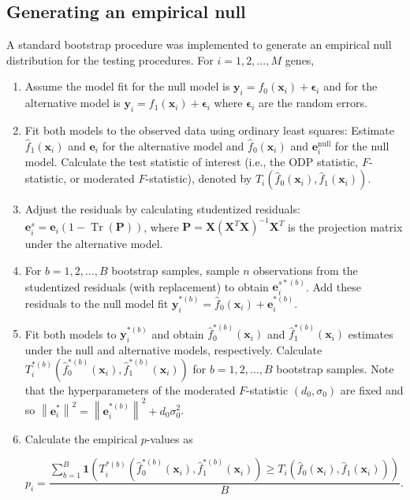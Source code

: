 \documentclass[11pt]{article}
\DeclareMathOperator{\Tr}{Tr}
\begin{document}
\subsection{Generating an empirical null\label{Subsec:null}}

A standard bootstrap procedure was implemented to generate an empirical null distribution for the testing procedures. For $i = 1,2,..., M$ genes,

\begin{enumerate}
\item Assume the model fit for the null model is $\mathbf{y}_{i} = f_{0}(\mathbf{x}_{i}) + \mathbf{\epsilon}_{i}$ and for the alternative model is $\mathbf{y}_{i} = f_{1}(\mathbf{x}_{i}) + \mathbf{\epsilon}_{i}$ where $\mathbf{\epsilon}_{i}$ are the random errors.
\item Fit both models to the observed data using ordinary least squares: Estimate $\hat{f}_{1}(\mathbf{x}_{i})$ and $\mathbf{e}_{i}$ for the alternative model and $\hat{f}_{0}(\mathbf{x}_{i})$ and $\mathbf{e}_{i}^{\text{null}}$ for the null model. Calculate the test statistic of interest (i.e., the ODP statistic, $F$-statistic, or moderated $F$-statistic), denoted by $T_{i}(\hat{f}_{0}(\mathbf{x}_{i}), \hat{f}_{1}(\mathbf{x}_{i}))$.
\item Adjust the residuals by calculating studentized residuals: $\mathbf{e}^{s}_{i}= \mathbf{e}_{i}(1-\Tr(\mathbf{P}))$, where $\mathbf{P} = \mathbf{X}(\mathbf{X}^{T}\mathbf{X})^{-1}\mathbf{X}^{T}$ is the projection matrix under the alternative model.
\item For $b=1,2,...,B$ bootstrap samples, sample $n$ observations from the studentized residuals (with replacement) to obtain $\mathbf{e}^{s*(b)}_{i}$. Add these residuals to the null model fit $\mathbf{y}^{*(b)}_{i} = \hat{f}_{0}(\mathbf{x}_{i}) + \mathbf{e}^{*(b)}_{i}$.
\item  Fit both models to $\mathbf{y}^{*(b)}_{i}$ and obtain $\hat{f}^{*(b)}_{0}(\mathbf{x}_{i})$ and $\hat{f}^{*(b)}_{1}(\mathbf{x}_{i})$ estimates under the null and alternative models, respectively. Calculate $T^{*(b)}_{i}(\hat{f}^{*(b)}_{0}(\mathbf{x}_{i}), \hat{f}^{*(b)}_{1}(\mathbf{x}_{i}))$ for $b = 1,2,...,B$ bootstrap samples. Note that the hyperparameters of the moderated $F$-statistic $(d_{0}, \sigma_{0})$ are fixed and so $\left\lVert\mathbf{e}^{*}_{i}\right\rVert ^ {2} = \left\lVert \mathbf{e}^{*(b)}_{i} \right\rVert ^ {2} + d_{0}\sigma_{0}^{2}$.
\item Calculate the empirical $p$-values as

$$
p_{i} = \dfrac{\sum_{b=1}^{B} \mathbf{1}\left(T^{*(b)}_{i}(\hat{f}^{*(b)}_{0}(\mathbf{x}_{i}), \hat{f}^{*(b)}_{1}(\mathbf{x}_{i})) \geq T_{i}(\hat{f}_{0}(\mathbf{x}_{i}), \hat{f}_{1}(\mathbf{x}_{i}))\right) }{B}.
$$
\end{enumerate}
\end{document}
